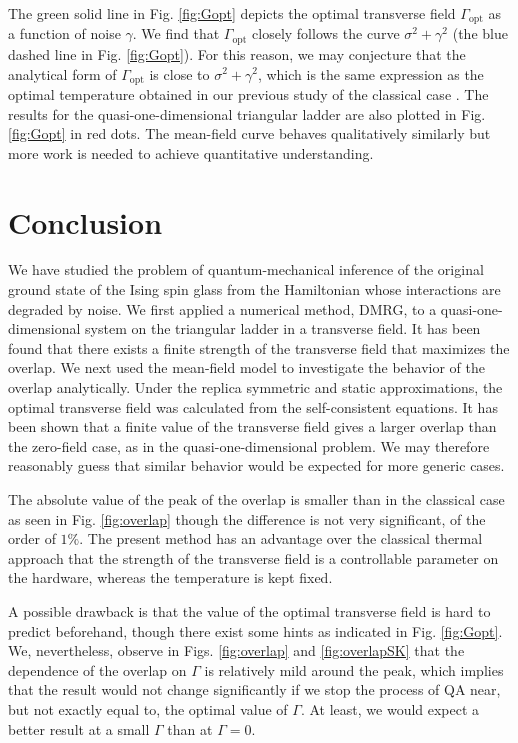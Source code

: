 \documentclass[aps,pra,twocolumn,groupedaddress,longbibliography]{revtex4}
\begin{document}
The green solid line in Fig. \ref{fig:Gopt} depicts the optimal transverse field $\Gamma_{\mathrm{opt}}$ as a function of noise $\gamma$. We find that  $\Gamma_{\mathrm{opt}}$ closely follows the curve $\sigma^2 + \gamma^2$ (the blue dashed line in Fig. \ref{fig:Gopt}). For this reason, we may conjecture that the analytical form of $\Gamma_{\mathrm{opt}}$ is close to $\sigma^2+\gamma^2$, which is the same expression as the optimal temperature obtained in our previous study of the classical case \cite{Nishimura2016}. The results for the quasi-one-dimensional triangular ladder are also plotted in Fig. \ref{fig:Gopt} in red dots.  The mean-field curve behaves qualitatively similarly but more work is needed to achieve quantitative understanding.

\section{Conclusion} 
\label{sec:conclusion}

We have studied the problem of quantum-mechanical inference of the original ground state of the Ising spin glass from the Hamiltonian whose interactions are degraded by noise. We first applied a numerical method, DMRG, to a quasi-one-dimensional system on the triangular ladder in a transverse field. It has been found that there exists a finite strength of the transverse field that maximizes the overlap. We next used the mean-field model to investigate the behavior of the overlap analytically. Under the replica symmetric and static approximations, the optimal transverse field was calculated from the self-consistent equations. It has been shown that a finite value of the transverse field gives a larger overlap than the zero-field case, as in the quasi-one-dimensional problem.  We may therefore reasonably guess that similar behavior would be expected for more generic cases.

The absolute value of the peak of the overlap is smaller than in the classical case as seen in Fig. \ref{fig:overlap} though the difference is not very significant, of the order of $1\%$. The present method has an advantage over the classical thermal approach that the strength of the transverse field is a controllable parameter on the hardware, whereas the temperature is kept fixed.

A possible drawback is that the value of the optimal transverse field is hard to predict beforehand, though there exist some hints as indicated in Fig. \ref{fig:Gopt}.  We, nevertheless, observe in Figs. \ref{fig:overlap} and \ref{fig:overlapSK} that the dependence of the overlap on $\Gamma$ is relatively mild around the peak, which implies that the result would not change significantly if we stop the process of QA near, but not exactly equal to, the optimal value of $\Gamma$. At least, we would expect a better result at a small $\Gamma$ than at $\Gamma =0$.
\end{document}

